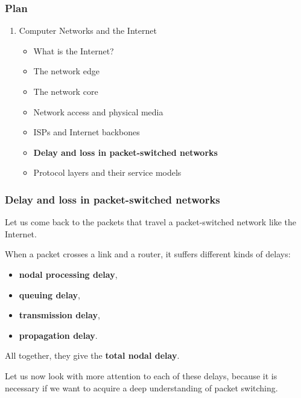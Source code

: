 
%
\begin{frame}
\frametitle{Plan}

\begin{enumerate}

  \item Computer Networks and the Internet

    \begin{itemize}

      \item What is the Internet?

      \item The network edge

      \item The network core

      \item Network access and physical media

      \item ISPs and Internet backbones

      \item \textbf{Delay and loss in packet-switched networks}

      \item Protocol layers and their service models

    \end{itemize}

\end{enumerate}

\end{frame}

%
\begin{frame}
\frametitle{Delay and loss in packet-switched networks}

Let us come back to the packets that travel a packet-switched network
like the Internet.

\bigskip

When a packet crosses a link and a router, it suffers different kinds
of delays:
\begin{itemize}

  \item \textbf{nodal processing delay},

  \item \textbf{queuing delay},

  \item \textbf{transmission delay},

  \item \textbf{propagation delay}.

\end{itemize}
All together, they give the \textbf{total nodal delay}.

\bigskip

Let us now look with more attention to each of these delays, because
it is necessary if we want to acquire a deep understanding of packet
switching.

\end{frame}

